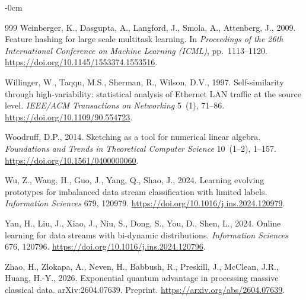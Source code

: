 \documentclass[sensors,article,submit,pdftex,moreauthors]{Definitions/mdpi}
\begin{document}
\begin{adjustwidth}{-\extralength}{0cm}
\begin{thebibliography}{999}
Weinberger, K., Dasgupta, A., Langford, J., Smola, A., Attenberg, J., 2009.
\newblock Feature hashing for large scale multitask learning.
\newblock In \emph{Proceedings of the 26th International Conference on Machine Learning (ICML)}, pp.~1113--1120.
\newblock \url{https://doi.org/10.1145/1553374.1553516}.

Willinger, W., Taqqu, M.S., Sherman, R., Wilson, D.V., 1997.
\newblock Self-similarity through high-variability: statistical analysis of Ethernet LAN traffic at the source level.
\newblock \emph{IEEE/ACM Transactions on Networking} 5~(1), 71--86.
\newblock \url{https://doi.org/10.1109/90.554723}.

Woodruff, D.P., 2014.
\newblock Sketching as a tool for numerical linear algebra.
\newblock \emph{Foundations and Trends in Theoretical Computer Science} 10~(1--2), 1--157.
\newblock \url{https://doi.org/10.1561/0400000060}.

Wu, Z., Wang, H., Guo, J., Yang, Q., Shao, J., 2024.
\newblock Learning evolving prototypes for imbalanced data stream classification with limited labels.
\newblock \emph{Information Sciences} 679, 120979.
\newblock \url{https://doi.org/10.1016/j.ins.2024.120979}.

Yan, H., Liu, J., Xiao, J., Niu, S., Dong, S., You, D., Shen, L., 2024.
\newblock Online learning for data streams with bi-dynamic distributions.
\newblock \emph{Information Sciences} 676, 120796.
\newblock \url{https://doi.org/10.1016/j.ins.2024.120796}.

Zhao, H., Zlokapa, A., Neven, H., Babbush, R., Preskill, J., McClean, J.R., Huang, H.-Y., 2026.
\newblock Exponential quantum advantage in processing massive classical data.
\newblock arXiv:2604.07639. Preprint.
\newblock \url{https://arxiv.org/abs/2604.07639}.

\end{thebibliography}
\end{adjustwidth}
\end{document}
